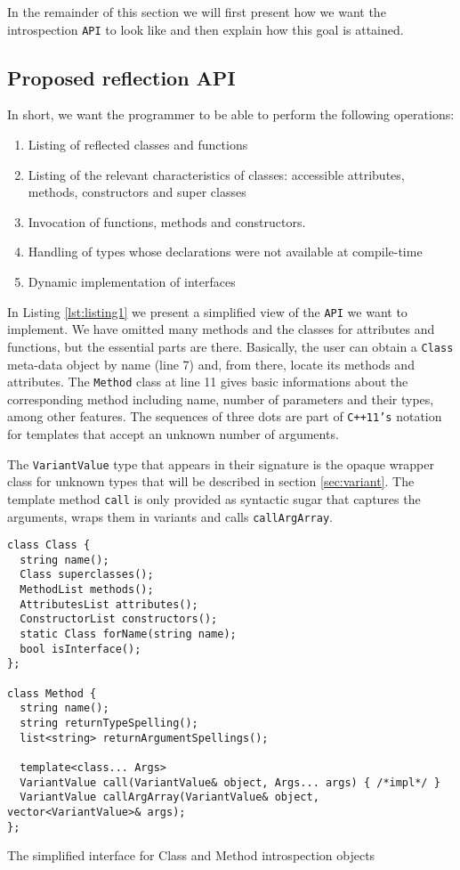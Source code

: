 In the remainder of this section we will first present how we want the introspection \texttt{API} to look like and then explain
how this goal is attained.

\subsection{Proposed reflection API}
\label{proposed}

In short, we want the programmer to be able to perform the following operations:
\begin{enumerate}
 \item Listing of reflected classes and functions
 \item Listing of the relevant characteristics of classes: accessible attributes, methods, constructors and super classes
 \item Invocation of functions, methods and constructors.
 \item Handling of types whose declarations were not available at compile-time
 \item Dynamic implementation of interfaces
\end{enumerate}

In Listing \ref{lst:listing1} we present a simplified view of the \texttt{API} we want to implement. We have omitted many methods and the classes for
attributes and functions, but the essential parts are there. Basically, the user can obtain a \texttt{Class} meta-data object by name (line 7) and,
from there, locate its methods and attributes. The \texttt{Method} class at line 11 gives basic informations about the corresponding method including
name, number of parameters and their types, among other features. The sequences of three dots are part of \texttt{C++11's} notation for templates that
accept an unknown number of arguments.

The \texttt{VariantValue} type that appears in their signature is the opaque wrapper class for unknown types that will be described in section \ref{sec:variant}.
The template method \texttt{call} is only provided as syntactic sugar that captures the arguments, wraps them in variants and
calls \texttt{callArgArray}.

\begin{listing}[H]
\begin{verbatim}
class Class {
  string name();
  Class superclasses();
  MethodList methods();
  AttributesList attributes();
  ConstructorList constructors();
  static Class forName(string name);
  bool isInterface();
};

class Method {
  string name();
  string returnTypeSpelling();
  list<string> returnArgumentSpellings();
  
  template<class... Args>
  VariantValue call(VariantValue& object, Args... args) { /*impl*/ }
  VariantValue callArgArray(VariantValue& object, vector<VariantValue>& args);
};
\end{verbatim}
\caption{The simplified interface for Class and Method introspection objects}
\label{lst:listing1}
\end{listing}

